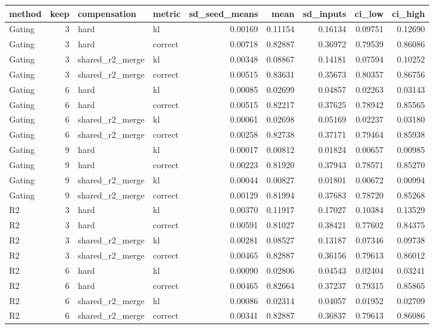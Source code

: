 \begin{tabular}{lrllrrrrr}
\toprule
method & keep & compensation & metric & sd_seed_means & mean & sd_inputs & ci_low & ci_high \\
\midrule
Gating & 3 & hard & kl & 0.00169 & 0.11154 & 0.16134 & 0.09751 & 0.12690 \\
Gating & 3 & hard & correct & 0.00718 & 0.82887 & 0.36972 & 0.79539 & 0.86086 \\
Gating & 3 & shared_r2_merge & kl & 0.00348 & 0.08867 & 0.14181 & 0.07594 & 0.10252 \\
Gating & 3 & shared_r2_merge & correct & 0.00515 & 0.83631 & 0.35673 & 0.80357 & 0.86756 \\
Gating & 6 & hard & kl & 0.00085 & 0.02699 & 0.04857 & 0.02263 & 0.03143 \\
Gating & 6 & hard & correct & 0.00515 & 0.82217 & 0.37625 & 0.78942 & 0.85565 \\
Gating & 6 & shared_r2_merge & kl & 0.00061 & 0.02698 & 0.05169 & 0.02237 & 0.03180 \\
Gating & 6 & shared_r2_merge & correct & 0.00258 & 0.82738 & 0.37171 & 0.79464 & 0.85938 \\
Gating & 9 & hard & kl & 0.00017 & 0.00812 & 0.01824 & 0.00657 & 0.00985 \\
Gating & 9 & hard & correct & 0.00223 & 0.81920 & 0.37943 & 0.78571 & 0.85270 \\
Gating & 9 & shared_r2_merge & kl & 0.00044 & 0.00827 & 0.01801 & 0.00672 & 0.00994 \\
Gating & 9 & shared_r2_merge & correct & 0.00129 & 0.81994 & 0.37683 & 0.78720 & 0.85268 \\
R2 & 3 & hard & kl & 0.00370 & 0.11917 & 0.17027 & 0.10384 & 0.13529 \\
R2 & 3 & hard & correct & 0.00591 & 0.81027 & 0.38421 & 0.77602 & 0.84375 \\
R2 & 3 & shared_r2_merge & kl & 0.00281 & 0.08527 & 0.13187 & 0.07346 & 0.09738 \\
R2 & 3 & shared_r2_merge & correct & 0.00465 & 0.82887 & 0.36156 & 0.79613 & 0.86012 \\
R2 & 6 & hard & kl & 0.00090 & 0.02806 & 0.04543 & 0.02404 & 0.03241 \\
R2 & 6 & hard & correct & 0.00465 & 0.82664 & 0.37237 & 0.79315 & 0.85865 \\
R2 & 6 & shared_r2_merge & kl & 0.00086 & 0.02314 & 0.04057 & 0.01952 & 0.02709 \\
R2 & 6 & shared_r2_merge & correct & 0.00341 & 0.82887 & 0.36837 & 0.79613 & 0.86086 \\

\end{tabular}
